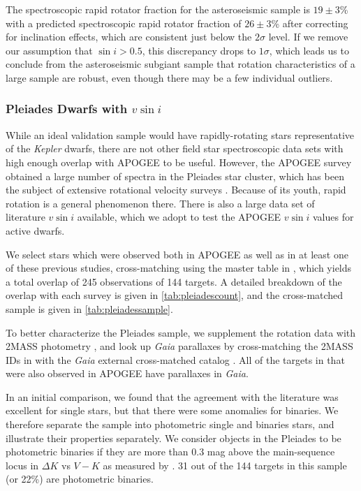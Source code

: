 \documentclass[preprint2]{aastex62}
\newcommand{\vsini}{\ensuremath{v \sin i}}
\newcommand{\Kepler}{\mbox{\textit{Kepler}}}
\newcommand{\Gaia}{\mbox{\textit{Gaia}}}
\begin{document}
The spectroscopic rapid rotator fraction for the asteroseismic sample is 
\(19 \pm 3\)\% with a predicted spectroscopic rapid rotator fraction 
of \(26 \pm 3\)\% after correcting for inclination effects, 
which are consistent just below the \(2\sigma\) level. If we remove our assumption that \(\sin i > 0.5\), this discrepancy drops to \(1 \sigma\), which leads us to conclude from the asteroseismic subgiant sample that rotation characteristics of a large sample are robust, even though there may be a few individual outliers.

\subsubsection{Pleiades Dwarfs with \vsini{}}
\label{sec:pleiades}


While an ideal validation sample would have rapidly-rotating stars 
representative of the \Kepler{} dwarfs, there are not other field star
spectroscopic data sets with high enough overlap with APOGEE to be useful. 
However, the APOGEE survey obtained a large number of spectra in the Pleiades 
star cluster, which has been the subject of extensive rotational velocity
surveys \citep{Stauffer87,Queloz98,Jackson18}. Because of its youth, rapid 
rotation is a general phenomenon there. There is also a large data set of literature
\vsini{} available, which we adopt to test the APOGEE \vsini{} values for 
active dwarfs. 



We select stars which were observed both in APOGEE as well as in 
at least one of these previous studies, cross-matching using the master table 
in \citet{Rebull16a}, which yields a total overlap of 245 observations of
144 targets. A detailed breakdown of the overlap with each survey is given in 
\cref{tab:pleiadescount}, and the cross-matched sample is given in \cref{tab:pleiadessample}. 

To better characterize the Pleiades sample, we supplement the rotation data
with 2MASS photometry \citep{Skrutskie06}, and look up \Gaia{} parallaxes by 
cross-matching the 2MASS IDs in \citet{Rebull16a} with the \Gaia{} external 
cross-matched catalog \citep{Marrese19}. All of the targets in 
\citet{Rebull16a} that were also observed in APOGEE have parallaxes in \Gaia{}.

In an initial comparison, we found that the agreement with the literature was
excellent for single stars, but that there were some anomalies for binaries. We
therefore separate the sample into photometric single and binaries stars, and
illustrate their properties separately. We consider objects in the Pleiades to 
be photometric binaries if they are more than 0.3 mag above the
main-sequence locus in \(\Delta K\) vs \(V-K\) as measured by 
\citet{Stauffer16}. 31 out of the 144 targets in this sample (or 22\%) are
photometric binaries.
\end{document}
